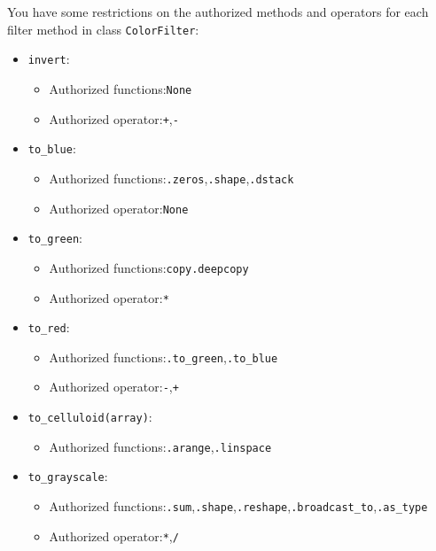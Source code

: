 \documentclass{42-en}
\begin{document}
You have some restrictions on the authorized methods and operators
for each filter method in class \texttt{ColorFilter}:
\begin{itemize}
  \item \texttt{invert}:
  \begin{itemize}
    \item Authorized functions:\texttt{None}
    \item Authorized operator:\texttt{+},\texttt{-}
  \end{itemize}
  \item \texttt{to\_blue}:
  \begin{itemize}
    \item Authorized functions:\texttt{.zeros},\texttt{.shape},\texttt{.dstack}
    \item Authorized operator:\texttt{None}
  \end{itemize}
  \item \texttt{to\_green}:
  \begin{itemize}
    \item Authorized functions:\texttt{copy.deepcopy}
    \item Authorized operator:\texttt{*}
  \end{itemize}
  \item \texttt{to\_red}:
  \begin{itemize}
    \item Authorized functions:\texttt{.to\_green},\texttt{.to\_blue}
    \item Authorized operator:\texttt{-},\texttt{+}
  \end{itemize}
  \item \texttt{to\_celluloid(array)}:
  \begin{itemize}
    \item Authorized functions:\texttt{.arange},\texttt{.linspace}
  \end{itemize}
  \item \texttt{to\_grayscale}:
  \begin{itemize}
    \item Authorized functions:\texttt{.sum},\texttt{.shape},\texttt{.reshape},\texttt{.broadcast\_to},\texttt{.as\_type}
    \item Authorized operator:\texttt{*},\texttt{/}
  \end{itemize}
\end{itemize}
\end{document}
